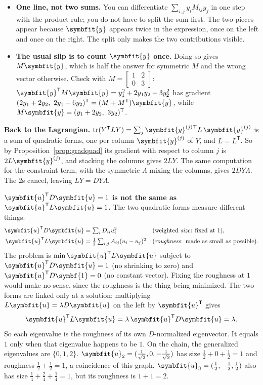 \documentclass[11pt]{article}
\newcommand{\bm}[1]{\symbfit{#1}}
\newcommand{\vu}{\bm{u}}
\newcommand{\one}{\symbf{1}}
\newcommand{\T}{^{\mathsf T}}
\newcommand{\tr}{\operatorname{tr}}
\begin{document}
\begin{careful}
\begin{itemize}[nosep,leftmargin=*]
\item \textbf{One line, not two sums.} You can differentiate $\sum_{i,j}y_iM_{ij}y_j$ in one step with the product rule; you do not have to split the sum first. The two pieces appear because $\bm y$ appears twice in the expression, once on the left and once on the right. The split only makes the two contributions visible.
\item \textbf{The usual slip is to count $\bm y$ once.} Doing so gives $M\bm y$, which is half the answer for symmetric $M$ and the wrong vector otherwise. Check with $M=\begin{bmatrix}1&2\\0&3\end{bmatrix}$: $\bm y\T M\bm y=y_1^2+2y_1y_2+3y_2^2$ has gradient $(2y_1+2y_2,\ 2y_1+6y_2)\T=(M+M\T)\bm y$, while $M\bm y=(y_1+2y_2,\ 3y_2)\T$.
\end{itemize}
\end{careful}

\textbf{Back to the Lagrangian.} $\tr(Y\T LY)=\sum_j\bm y^{(j)\top}L\,\bm y^{(j)}$ is a sum of quadratic forms, one per column $\bm y^{(j)}$ of $Y$, and $L=L\T$. So by Proposition~\ref{prop:gradquad} its gradient with respect to column $j$ is $2L\bm y^{(j)}$, and stacking the columns gives $2LY$. The same computation for the constraint term, with the symmetric $\Lambda$ mixing the columns, gives $2DY\Lambda$. The $2$s cancel, leaving $LY=DY\Lambda$.

\begin{careful}
\textbf{$\vu\T D\vu=1$ is not the same as $\vu\T L\vu=1$.} The two quadratic forms measure different things:
\begin{align*}
\vu\T D\vu&=\textstyle\sum_iD_{ii}u_i^2 && (\text{weighted \emph{size}: fixed at }1),\\
\vu\T L\vu&=\tfrac12\textstyle\sum_{i,j}A_{ij}(u_i-u_j)^2 && (\text{\emph{roughness}: made as small as possible}).
\end{align*}
The problem is $\min\vu\T L\vu$ subject to $\vu\T D\vu=1$ (no shrinking to zero) and $\vu\T D\one=0$ (no constant vector). Fixing the roughness at $1$ would make no sense, since the roughness is the thing being minimized. The two forms are linked only at a solution: multiplying $L\vu=\lambda D\vu$ on the left by $\vu\T$ gives
\[
\vu\T L\vu=\lambda\,\vu\T D\vu=\lambda .
\]
So each eigenvalue is the roughness of its own $D$-normalized eigenvector. It equals $1$ only when that eigenvalue happens to be $1$. On the chain, the generalized eigenvalues are $\{0,1,2\}$. $\vu_2=(\tfrac1{\sqrt2},0,-\tfrac1{\sqrt2})$ has size $\tfrac12+0+\tfrac12=1$ and roughness $\tfrac12+\tfrac12=1$, a coincidence of this graph. $\vu_3=(\tfrac12,-\tfrac12,\tfrac12)$ also has size $\tfrac14+\tfrac24+\tfrac14=1$, but its roughness is $1+1=2$.
\end{careful}
\end{document}
